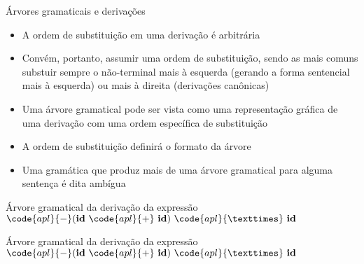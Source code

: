 \begin{frame}[fragile]{Árvores gramaticais e derivações}

    \begin{itemize}
        \item A ordem de substituição em uma derivação é arbitrária

        \item Convém, portanto, assumir uma ordem de substituição, sendo as mais comuns substuir sempre o não-terminal mais à esquerda (gerando a forma sentencial
            mais à esquerda) ou mais à direita (derivações canônicas)

        \item Uma árvore gramatical pode ser vista como uma representação gráfica de uma derivação com uma ordem específica de substituição

        \item A ordem de substituição definirá o formato da árvore

        \item Uma gramática que produz mais de uma árvore gramatical para alguma sentença é dita ambígua
    \end{itemize}

\end{frame}

\begin{frame}[fragile]{Árvore gramatical da derivação da expressão $\code{apl}{-}(\textbf{id}\ \code{apl}{+}\ \textbf{id})\ \code{apl}{×}\ \textbf{id}$}

    \begin{figure}
        \centering 

    \end{figure}

\end{frame}

\begin{frame}[fragile]{Árvore gramatical da derivação da expressão $\code{apl}{-}(\textbf{id}\ \code{apl}{+}\ \textbf{id})\ \code{apl}{×}\ \textbf{id}$}

    \begin{figure}
        \centering 

    \end{figure}

\end{frame}

